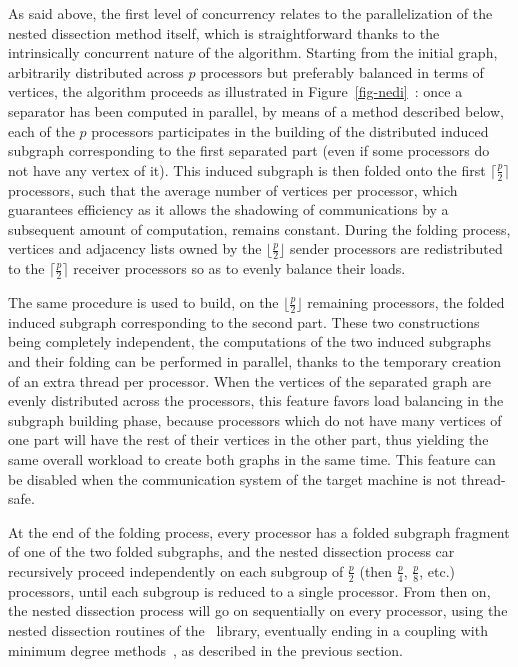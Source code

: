 As said above, the first level of concurrency relates to the
parallelization of the nested dissection method itself, which is
straightforward thanks to the intrinsically concurrent nature of the
algorithm. Starting from the initial graph, arbitrarily distributed
across $p$ processors but preferably balanced in terms of vertices,
the algorithm proceeds as illustrated in Figure~\ref{fig-nedi}~: once
a separator has been computed in parallel, by means of a method described
below, each of the $p$ processors participates in the building of the
distributed induced subgraph corresponding to the first separated part
(even if some processors do not have any vertex of it). This induced
subgraph is then folded onto the first $\lceil\frac{p}{2}\rceil$
processors, such that the average number of vertices per processor,
which guarantees efficiency as it allows the shadowing of
communications by a subsequent amount of computation, remains
constant. During the folding process, vertices and adjacency lists
owned by the $\lfloor\frac{p}{2}\rfloor$ sender processors are
redistributed to the $\lceil\frac{p}{2}\rceil$ receiver processors so
as to evenly balance their loads.

The same procedure is used to build, on the
$\lfloor\frac{p}{2}\rfloor$ remaining processors, the folded induced
subgraph corresponding to the second part. These two constructions
being completely independent, the computations of the two induced
subgraphs and their folding can be performed in parallel, thanks to the
temporary creation of an extra thread per processor. When the vertices
of the separated graph are evenly distributed across the processors,
this feature favors load balancing in the subgraph building phase,
because processors which do not have many vertices of one part will
have the rest of their vertices in the other part, thus yielding the
same overall workload to create both graphs in the same time. This
feature can be disabled when the communication system of the target
machine is not thread-safe.

At the end of the folding process, every processor has a folded
subgraph fragment of one of the two folded subgraphs, and the nested
dissection process car recursively proceed independently on each
subgroup of $\frac{p}{2}$ (then $\frac{p}{4}$, $\frac{p}{8}$,
etc\@.) processors, until each subgroup is reduced to a single
processor. From then on, the nested dissection process will go on
sequentially on every processor, using the nested dissection routines
of the \scotch\ library, eventually ending in a coupling with minimum
degree methods~\cite{peroam00a}, as described in the previous section.

